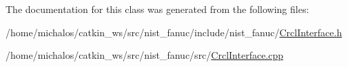 The documentation for this class was generated from the following files\-:\begin{DoxyCompactItemize}
\item 
/home/michalos/catkin\-\_\-ws/src/nist\-\_\-fanuc/include/nist\-\_\-fanuc/\hyperlink{CrclInterface_8h}{Crcl\-Interface.\-h}\item 
/home/michalos/catkin\-\_\-ws/src/nist\-\_\-fanuc/src/\hyperlink{CrclInterface_8cpp}{Crcl\-Interface.\-cpp}\end{DoxyCompactItemize}
